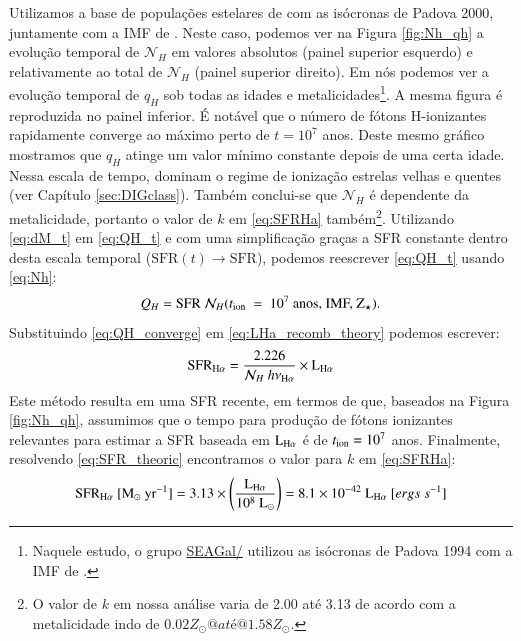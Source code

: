 Utilizamos a base de populações estelares de \citet{Bruzual.Charlot.2003} com as isócronas de Padova 2000, juntamente com a IMF de \citet{Salpeter.1955a}. Neste caso, podemos ver na Figura \ref{fig:Nh_qh} a evolução temporal de $\mathcal{N}_H$ em valores absolutos (painel superior esquerdo) e relativamente ao total de $\mathcal{N}_H$ (painel superior direito). Em \citet[Figura 2b]{CidFernandes.etal.2011a} nós podemos ver a evolução temporal de $q_H$ sob todas as idades e metalicidades\footnote{Naquele estudo, o grupo \href{http://starlight.ufsc.br}{SEAGal/\STARLIGHT} utilizou as isócronas de Padova 1994 com a IMF de \citet{Chabrier.2003a}.}. A mesma figura é reproduzida no painel inferior. É notável que o número de fótons H-ionizantes rapidamente converge ao máximo perto de $t = 10^7$ anos. Deste mesmo gráfico mostramos que $q_H$ atinge um valor mínimo constante depois de uma certa idade. Nessa escala de tempo, dominam o regime de ionização estrelas velhas e quentes (ver Capítulo \ref{sec:DIGclass}). Também conclui-se que $\mathcal{N}_H$ é dependente da metalicidade, portanto o valor de $k$ em \eqref{eq:SFRHa} também\footnote{O valor de $k$ em nossa análise varia de 2.00 até 3.13 de acordo com a metalicidade indo de $0.02 Z_\odot@ até @1.58 Z_\odot$.}. Utilizando \eqref{eq:dM_t} em \eqref{eq:QH_t} e com uma simplificação graças a SFR constante dentro desta escala temporal ($\mathrm{SFR}(t)\rightarrow \mathrm{SFR}$), podemos reescrever \eqref{eq:QH_t} usando \eqref{eq:Nh}:
\begin{equation}
	Q_H = \mathrm{SFR}\ \mathcal{N}_H(t_{\rm ion}\ =\ 10^7\ \textrm{anos, IMF, Z}{}_\star).
	\label{eq:QH_converge}
\end{equation}
\noindent Substituindo \eqref{eq:QH_converge} em \eqref{eq:LHa_recomb_theory} podemos escrever:
\begin{equation}
	\mathrm{SFR}_{\Ha} = \frac{2.226}{\mathcal{N}_H\ h \nu_{\Ha}} \times \LHalpha
	\label{eq:SFR_theoric}
\end{equation}
\noindent Este método resulta em uma SFR recente, em termos de que, baseados na Figura \ref{fig:Nh_qh}, assumimos que o tempo para produção de fótons ionizantes relevantes para estimar a SFR baseada em $\LHalpha$ é de $t_{\rm ion} = 10^7$ anos. Finalmente, resolvendo \eqref{eq:SFR_theoric} encontramos o valor para $k$ em \eqref{eq:SFRHa}:
\begin{equation}
	\mathrm{SFR}_{\Ha}\ [\mathrm{M}_\odot\ \mathrm{yr}^{-1}] = 3.13 \times
	\left(\frac{\LHalpha}{10^8\ \mathrm{L}_\odot}\right) = 8.1 \times 10^{-42}\ \LHalpha\ [ergs\ s^{-1}]
	\label{eq:SFRNeb}
\end{equation}


